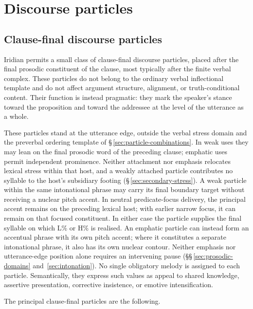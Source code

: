 \section{Discourse particles}\label{sec:discourse-particles}\label{sec:discourse-word-order}


\subsection{Clause-final discourse particles}\label{sec:disc-final-particles}

Iridian permits a small class of clause-final discourse particles, placed after
the final prosodic constituent of the clause, most typically after the finite
verbal complex. These particles do not belong to the ordinary verbal
inflectional template and do not affect argument structure, alignment, or
truth-conditional content. Their function is instead pragmatic: they mark the
speaker's stance toward the proposition and toward the addressee at the level of
the utterance as a whole.

These particles stand at the utterance edge, outside the verbal stress domain
and the preverbal ordering template of §\,\ref{sec:particle-combinations}.
In weak uses they may lean on the final prosodic word of the preceding clause;
emphatic uses permit independent prominence. Neither attachment nor emphasis
relocates lexical stress within that host, and a weakly attached particle
contributes no syllable to the host's subsidiary footing
(§\,\ref{sec:secondary-stress}). A weak particle within the same
intonational phrase may carry its final boundary target without receiving
a nuclear pitch accent. In neutral predicate-focus delivery, the principal
accent remains on the preceding lexical host; with earlier narrow focus,
it can remain on that focused constituent. In either case the particle
supplies the final syllable on which L\% or H\% is realised. An emphatic particle can instead form an accentual
phrase with its own pitch accent; where it constitutes a separate
intonational phrase, it also has its own nuclear contour. Neither emphasis
nor utterance-edge position alone requires an intervening pause
(§§\,\ref{sec:prosodic-domains} and~\ref{sec:intonation}). No single
obligatory melody is assigned to each particle. Semantically, they express such
values as appeal to shared knowledge, assertive presentation, corrective
insistence, or emotive intensification.

The principal clause-final particles are the following.

